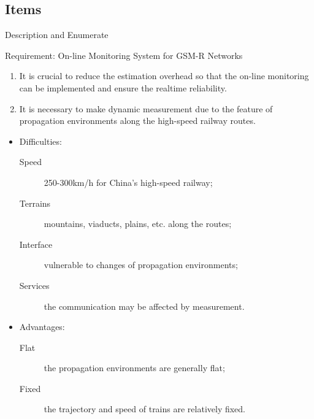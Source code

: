 \subsection{Items}
\begin{frame}{Description and Enumerate}
\begin{block}{Requirement: On-line Monitoring System for GSM-R Networks}
\begin{enumerate}
  \item It is crucial to reduce the estimation overhead so that the \alert{on-line monitoring} can be implemented and ensure the realtime reliability.
  \item It is necessary to make \alert{dynamic measurement} due to the feature of propagation environments along the high-speed railway routes.
\end{enumerate}
\end{block}
\begin{itemize}
\item Difficulties:
\begin{description}
  \item[Speed] 250-300km/h for China's high-speed railway;
  \item[Terrains] mountains, viaducts, plains, etc. along the routes;
  \item[Interface] vulnerable to changes of propagation environments;
  \item[Services] the communication may be affected by measurement.
\end{description}
\item Advantages:
\begin{description}
  \item[Flat] the propagation environments are generally flat;
  \item[Fixed] the trajectory and speed of trains are relatively fixed.
\end{description}
\end{itemize}
\end{frame}

